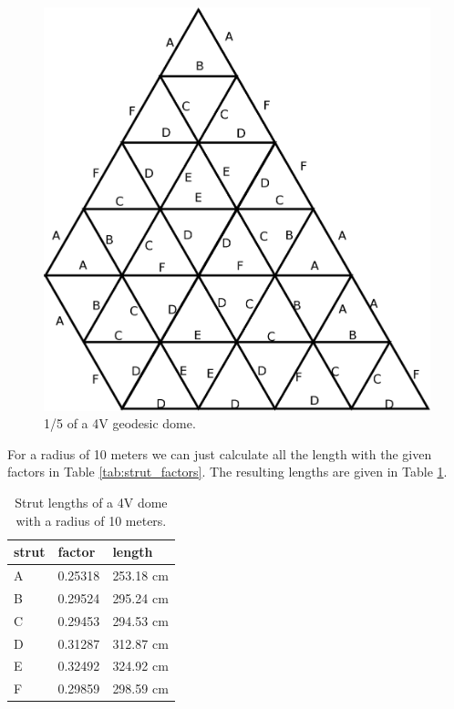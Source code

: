 \documentclass[a4paper,12pt]{article}
\begin{document}
\begin{figure}
	\centering
	\includegraphics[width=0.7\linewidth]{../images/tiling_4v.eps}
	\caption{1/5 of a 4V geodesic dome.}
	\label{fig:tiling_4v}
\end{figure}

For a radius of 10 meters we can just calculate all the length with the given factors in Table \ref{tab:strut_factors}. The resulting lengths are given in Table \ref{tab:length4v}.

\begin{table}
	\centering
	\caption{Strut lengths of a 4V dome with a radius of 10 meters.}
	\begin{tabular}{l|ll}
strut	& factor	& length				\\	\hline
	A	& 0.25318	& 253.18 cm		\\
	B	& 0.29524	& 295.24 cm	\\
	C	& 0.29453	& 294.53 cm	\\
	D	& 0.31287	& 312.87 cm		\\
	E	& 0.32492 	& 324.92 cm		\\
	F	& 0.29859	& 298.59 cm	
	\end{tabular}
	\label{tab:length4v}
\end{table}
\end{document}
